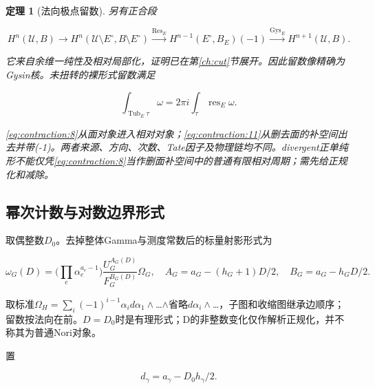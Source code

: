 \documentclass[11pt,a4paper,oneside]{ctexart}
\theoremstyle{cnplain}
\newtheorem{theorem}{定理}[section]
\theoremstyle{definition}
\theoremstyle{remark}
\numberwithin{equation}{section}
\begin{document}
\begin{theorem}[法向极点留数]

\label{thm:contraction:3.2} 另有正合段

\begin{equation}
H^n(\mathcal U,B)\longrightarrow
 H^n(\mathcal U\setminus E^\circ,B\setminus E^\circ)
 \xrightarrow{\operatorname{Res}_E}
 H^{n-1}(E^\circ,B_E)(-1)
 \xrightarrow{\operatorname{Gys}_E}H^{n+1}(\mathcal U,B).          \label{eq:contraction:11}
\end{equation}

它来自余维一纯性及相对局部化，证明已在第\ref{ch:cut}节展开。因此留数像精确为Gysin核。未扭转的裸形式留数满足

\begin{equation}
\int_{\operatorname{Tub}_E\tau}\omega
                     =2\pi i\int_\tau\operatorname{res}_E\omega.              \label{eq:contraction:12}
\end{equation}

\eqref{eq:contraction:8}从面对象进入相对对象；\eqref{eq:contraction:11}从删去面的补空间出去并带(-1)。两者来源、方向、次数、Tate因子及物理链均不同。divergent正单纯形不能仅凭\eqref{eq:contraction:8}当作删面补空间中的普通有限相对周期；需先给正规化和减除。

\end{theorem}


\subsection{幂次计数与对数边界形式}\label{sec:contraction:4}

取偶整数\(D_0\)。去掉整体Gamma与测度常数后的标量射影形式为

\begin{equation}
\omega_G(D)=\Big(\prod_e\alpha_e^{a_e-1}\Big)
       \frac{U_G^{A_G(D)}}{F_G^{B_G(D)}}\Omega_G,
 \quad A_G=a_G-(h_G+1)D/2,\quad B_G=a_G-h_GD/2.                  \label{eq:contraction:13}
\end{equation}

取标准\(\Omega _H=\sum _i(- 1)^{i- 1}\alpha _i d\alpha _1\wedge \)\ldots{}\(\wedge \)省略\(d\alpha _i\wedge \)\ldots，子图和收缩图继承边顺序；留数按法向在前。\(D=D_0\)时是有理形式；D的非整数变化仅作解析正规化，并不称其为普通Nori对象。

置

\begin{equation}
d_\gamma=a_\gamma-D_0h_\gamma/2.        \label{eq:contraction:14}
\end{equation}
\end{document}
